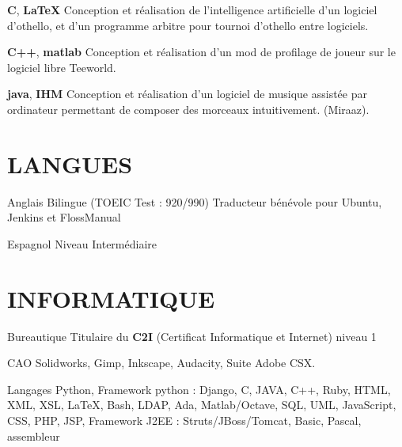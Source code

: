 \documentclass[11pt,a4paper]{moderncv}
\begin{document}
  \cvline
    {\textbf{C}, \textbf{\LaTeX}}
    {
      Conception et réalisation de l'intelligence artificielle d'un logiciel
      d'othello, et d'un programme arbitre pour tournoi d'othello entre
      logiciels.
    }{}{}

  \cvline
    {\textbf{C++}, \textbf{matlab} }
    {
      Conception et réalisation d'un mod de profilage de joueur sur le logiciel
      libre Teeworld.
    }{}{}

  \cvline
    {\textbf{java}, \textbf{IHM}}
    {
      Conception et réalisation d'un logiciel de musique assistée par
      ordinateur permettant de composer des morceaux intuitivement. (Miraaz).
    }{}{}


  \section{LANGUES}

  \cvlanguage
    {Anglais}
    {Bilingue (TOEIC Test : 920/990)}
    {Traducteur bénévole pour Ubuntu, Jenkins et FlossManual}

  \cvlanguage
    {Espagnol}
    {Niveau Intermédiaire}
    {}{}{}{}

  \section{INFORMATIQUE}
  \cvline
    {Bureautique}
    {Titulaire du \textbf{C2I} (Certificat Informatique et Internet) niveau 1}
    {}{}

  \cvline
    {CAO}
    {Solidworks, Gimp, Inkscape, Audacity, Suite Adobe CSX.}
    {}{}

  \cvline
    {Langages}
    {
      Python, Framework python : Django, C, JAVA, C++, Ruby, HTML, XML, XSL,
      \LaTeX{}, Bash, LDAP, Ada, Matlab/Octave, SQL, UML, JavaScript, CSS,
      PHP, JSP, Framework J2EE : Struts/JBoss/Tomcat, Basic, Pascal, assembleur
    }{}{}
\end{document}
